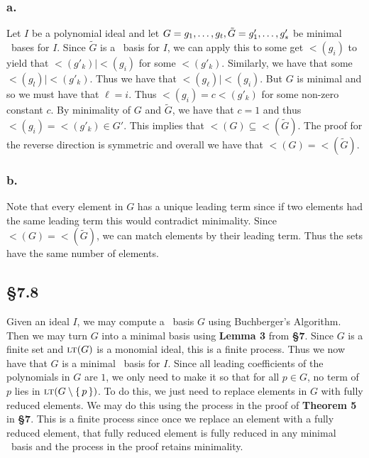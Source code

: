 \documentclass[letterpaper]{article}
\begin{document}
\subsubsection*{a.}

Let $I$ be a polynomial ideal and let $G = \gen{g_{1}, \ldots, g_{t}}, \tilde{G} = \gen{g'_{1}, \ldots, g'_{s}}$ be minimal \Grobner\ bases for $I$.
Since $\tilde{G}$ is a \Grobner\ basis for $I$, we can apply this to some get $\lt(g_{i})$ to yield that $\lt(g'_{k}) \mid \lt(g_{i})$ for some $\lt(g'_{k})$.
Similarly, we have that some $\lt(g_{l}) \mid \lt(g'_{k})$.
Thus we have that $\lt(g_{\ell}) \mid \lt(g_{i})$.
But $G$ is minimal and so we must have that $\ell = i$.
Thus $\lt(g_{i}) = c \lt(g'_{k})$ for some non-zero constant $c$.
By minimality of $G$ and $\tilde{G}$, we have that $c = 1$ and thus $\lt(g_{i}) = \lt(g'_{k}) \in G'$.
This implies that $\lt(G) \subseteq \lt(\tilde{G})$.
The proof for the reverse direction is symmetric and overall we have that $\lt(G) = \lt(\tilde{G})$.

\subsubsection*{b.}

Note that every element in $G$ has a unique leading term since if two elements had the same leading term this would contradict minimality.
Since $\lt(G) = \lt(\tilde{G})$, we can match elements by their leading term.
Thus the sets have the same number of elements.

\subsection*{\S 7.8}

Given an ideal $I$, we may compute a \Grobner\ basis $G$ using Buchberger's Algorithm.
Then we may turn $G$ into a minimal basis using \textbf{Lemma 3} from \textbf{\S 7}.
Since $G$ is a finite set and $\gen{\lt(G)}$ is a monomial ideal, this is a finite process.
Thus we now have that $G$ is a minimal \Grobner\ basis for $I$.
Since all leading coefficients of the polynomials in $G$ are $1$, we only need to make it so that for all $p \in G$, no term of $p$ lies in $\gen{\lt(G \setminus \set{p})}$.
To do this, we just need to replace elements in $G$ with fully reduced elements.
We may do this using the process in the proof of \textbf{Theorem 5} in \textbf{\S 7}.
This is a finite process since once we replace an element with a fully reduced element, that fully reduced element is fully reduced in any minimal \Grobner\ basis and the process in the proof retains minimality.
\end{document}

